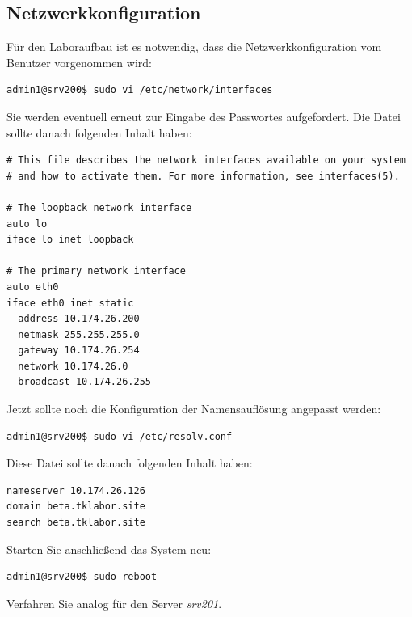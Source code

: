 \subsection{Netzwerkkonfiguration}
Für den Laboraufbau ist es notwendig, dass die Netzwerkkonfiguration vom
Benutzer vorgenommen wird:
\begin{lstlisting}
admin1@srv200$ sudo vi /etc/network/interfaces
\end{lstlisting}
Sie werden eventuell erneut zur Eingabe des Passwortes aufgefordert. Die Datei
sollte danach folgenden Inhalt haben:
\begin{scriptsize}
\begin{lstlisting}
# This file describes the network interfaces available on your system
# and how to activate them. For more information, see interfaces(5).

# The loopback network interface
auto lo
iface lo inet loopback

# The primary network interface
auto eth0
iface eth0 inet static
  address 10.174.26.200
  netmask 255.255.255.0
  gateway 10.174.26.254
  network 10.174.26.0
  broadcast 10.174.26.255
\end{lstlisting}
\end{scriptsize}

Jetzt sollte noch die Konfiguration der Namensauflösung angepasst werden:
\begin{lstlisting}
admin1@srv200$ sudo vi /etc/resolv.conf
\end{lstlisting}
Diese Datei sollte danach folgenden Inhalt haben:
\begin{scriptsize}
\begin{lstlisting}
nameserver 10.174.26.126
domain beta.tklabor.site
search beta.tklabor.site
\end{lstlisting}
\end{scriptsize}
Starten Sie anschließend das System neu:
\begin{lstlisting}
admin1@srv200$ sudo reboot
\end{lstlisting}
Verfahren Sie analog für den Server \textit{srv201}.

